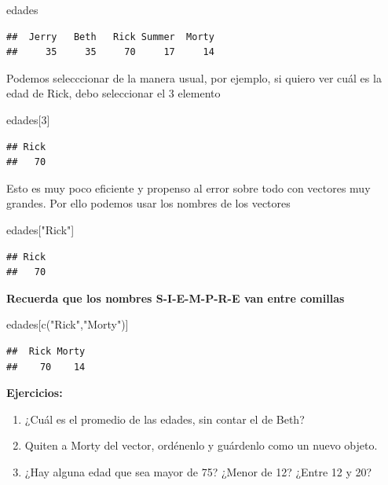 \documentclass[
]{book}
\newenvironment{Shaded}{\begin{snugshade}}{\end{snugshade}}
\newcommand{\DecValTok}[1]{\textcolor[rgb]{0.00,0.00,0.81}{#1}}
\newcommand{\FunctionTok}[1]{\textcolor[rgb]{0.00,0.00,0.00}{#1}}
\newcommand{\NormalTok}[1]{#1}
\newcommand{\StringTok}[1]{\textcolor[rgb]{0.31,0.60,0.02}{#1}}
\providecommand{\tightlist}{%
  \setlength{\itemsep}{0pt}\setlength{\parskip}{0pt}}
\begin{document}
\begin{Shaded}
\begin{Highlighting}[]
\NormalTok{edades}
\end{Highlighting}
\end{Shaded}

\begin{verbatim}
##  Jerry   Beth   Rick Summer  Morty 
##     35     35     70     17     14
\end{verbatim}

Podemos selecccionar de la manera usual, por ejemplo, si quiero ver cuál es la edad de Rick, debo seleccionar el 3 elemento

\begin{Shaded}
\begin{Highlighting}[]
\NormalTok{edades[}\DecValTok{3}\NormalTok{]}
\end{Highlighting}
\end{Shaded}

\begin{verbatim}
## Rick 
##   70
\end{verbatim}

Esto es muy poco eficiente y propenso al error sobre todo con vectores muy grandes. Por ello podemos usar los nombres de los vectores

\begin{Shaded}
\begin{Highlighting}[]
\NormalTok{edades[}\StringTok{"Rick"}\NormalTok{]}
\end{Highlighting}
\end{Shaded}

\begin{verbatim}
## Rick 
##   70
\end{verbatim}

\textbf{Recuerda que los nombres S-I-E-M-P-R-E van entre comillas}

\begin{Shaded}
\begin{Highlighting}[]
\NormalTok{edades[}\FunctionTok{c}\NormalTok{(}\StringTok{"Rick"}\NormalTok{,}\StringTok{"Morty"}\NormalTok{)]}
\end{Highlighting}
\end{Shaded}

\begin{verbatim}
##  Rick Morty 
##    70    14
\end{verbatim}

\textbf{Ejercicios:}

\begin{enumerate}
\def\labelenumi{\arabic{enumi}.}
\tightlist
\item
  ¿Cuál es el promedio de las edades, sin contar el de Beth?
\item
  Quiten a Morty del vector, ordénenlo y guárdenlo como un nuevo objeto.
\item
  ¿Hay alguna edad que sea mayor de 75? ¿Menor de 12? ¿Entre 12 y 20?
\end{enumerate}
\end{document}
